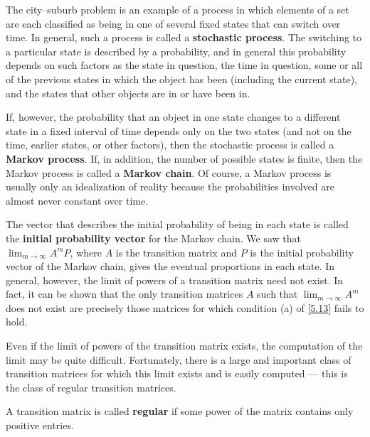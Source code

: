 \begin{defn}\label{5.3.6}
  The city--suburb problem is an example of a process in which elements of a set are each classified as being in one of several fixed states that can switch over time.
  In general, such a process is called a \textbf{stochastic process}.
  The switching to a particular state is described by a probability, and in general this probability depends on such factors as the state in question, the time in question, some or all of the previous states in which the object has been (including the current state), and the states that other objects are in or have been in.

  If, however, the probability that an object in one state changes to a different state in a fixed interval of time depends only on the two states (and not on the time, earlier states, or other factors), then the stochastic process is called a \textbf{Markov process}.
  If, in addition, the number of possible states is finite, then the Markov process is called a \textbf{Markov chain}.
  Of course, a Markov process is usually only an idealization of reality because the probabilities involved are almost never constant over time.

  The vector that describes the initial probability of being in each state is called the \textbf{initial probability vector} for the Markov chain.
  We saw that \(\lim_{m \to \infty} A^m P\), where \(A\) is the transition matrix and \(P\) is the initial probability vector of the Markov chain, gives the eventual proportions in each state.
  In general, however, the limit of powers of a transition matrix need not exist.
  In fact, it can be shown that the only transition matrices \(A\) such that \(\lim_{m \to \infty} A^m\) does not exist are precisely those matrices for which condition (a) of \cref{5.13} fails to hold.
\end{defn}

\begin{note}
  Even if the limit of powers of the transition matrix exists, the computation of the limit may be quite difficult.
  Fortunately, there is a large and important class of transition matrices for which this limit exists and is easily computed
  --- this is the class of regular transition matrices.
\end{note}

\begin{defn}\label{5.3.7}
  A transition matrix is called \textbf{regular} if some power of the matrix contains only positive entries.
\end{defn}

